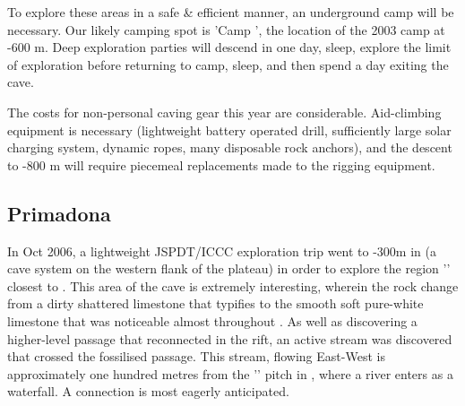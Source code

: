 To explore these areas in a safe \& efficient manner, an underground camp will be necessary. Our likely camping spot is 'Camp ', the location of the 2003 camp at -600 m. Deep exploration parties will descend in one day, sleep, explore the limit of exploration before returning to camp, sleep, and then spend a day exiting the cave.

The costs for non-personal caving gear this year are considerable. Aid-climbing equipment is necessary (lightweight battery operated drill, sufficiently large solar charging system, dynamic ropes, many disposable rock anchors), and the descent to -800 m will require piecemeal replacements made to the rigging equipment.





\subsection{Primadona}

In Oct 2006, a lightweight JSPDT/ICCC exploration trip went to -300m in  (a cave system on the western flank of the plateau) in order to explore the region '' closest to . This area of the cave is extremely interesting, wherein the rock change from a dirty shattered limestone that typifies  to the smooth soft pure-white limestone that was noticeable almost throughout . As well as discovering a higher-level passage that reconnected in the rift, an active stream was discovered that crossed the fossilised passage. This stream, flowing East-West is approximately one hundred metres from the '' pitch in , where a river enters as a waterfall. A connection is most eagerly anticipated.



